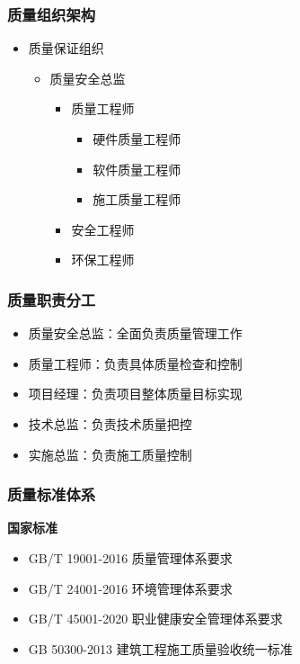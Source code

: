 \documentclass[UTF8,a4paper,12pt]{article}
\begin{document}
\subsubsection{质量组织架构}
\begin{itemize}
    \item 质量保证组织
    \begin{itemize}
        \item 质量安全总监
        \begin{itemize}
            \item 质量工程师
            \begin{itemize}
                \item 硬件质量工程师
                \item 软件质量工程师
                \item 施工质量工程师
            \end{itemize}
            \item 安全工程师
            \item 环保工程师
        \end{itemize}
    \end{itemize}
\end{itemize}

\subsubsection{质量职责分工}
\begin{itemize}
    \item 质量安全总监：全面负责质量管理工作
    \item 质量工程师：负责具体质量检查和控制
    \item 项目经理：负责项目整体质量目标实现
    \item 技术总监：负责技术质量把控
    \item 实施总监：负责施工质量控制
\end{itemize}

\subsubsection{质量标准体系}
\textbf{国家标准}
\begin{itemize}
    \item GB/T 19001-2016 质量管理体系要求
    \item GB/T 24001-2016 环境管理体系要求
    \item GB/T 45001-2020 职业健康安全管理体系要求
    \item GB 50300-2013 建筑工程施工质量验收统一标准
\end{itemize}
\end{document}
